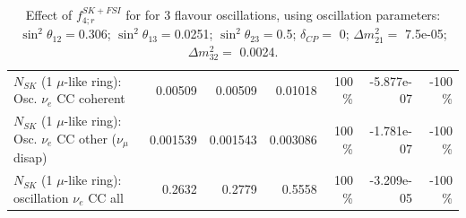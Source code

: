 \begin{table}
\begin{tabular}{| l | r | r | r  r | r  r |}
                          $N_{SK}$ (1 $\mu$-like ring): Osc. $\nu_e$ CC coherent &         0.00509 &         0.00509 &         0.01018 &      100 \%  &      -5.877e-07 &     -100 \%  \\ 
           $N_{SK}$ (1 $\mu$-like ring): Osc. $\nu_e$ CC other ($\nu_\mu$ disap) &        0.001539 &        0.001543 &        0.003086 &      100 \%  &      -1.781e-07 &     -100 \%  \\ 
                        $N_{SK}$ (1 $\mu$-like ring): oscillation $\nu_e$ CC all &          0.2632 &          0.2779 &          0.5558 &      100 \%  &      -3.209e-05 &     -100 \%  \\ 
\hline
\hline
\end{tabular}
\caption{ Effect of $f_{4; r}^{SK+FSI}$ for for 3 flavour oscillations, using oscillation parameters:  $\sin^2\theta_{12} = $0.306; $\sin^2\theta_{13} = $0.0251; $\sin^2\theta_{23} = $0.5; $\delta_{CP} = $        0; $\Delta m^2_{21} = $    7.5e-05; $\Delta m^2_{32} = $    0.0024. }
\label{tab:num_skdetfsi_004_1RmuT_3f_osc_t13:0.0251_spectralreco_spectraltrue}
\end{table}
\clearpage
